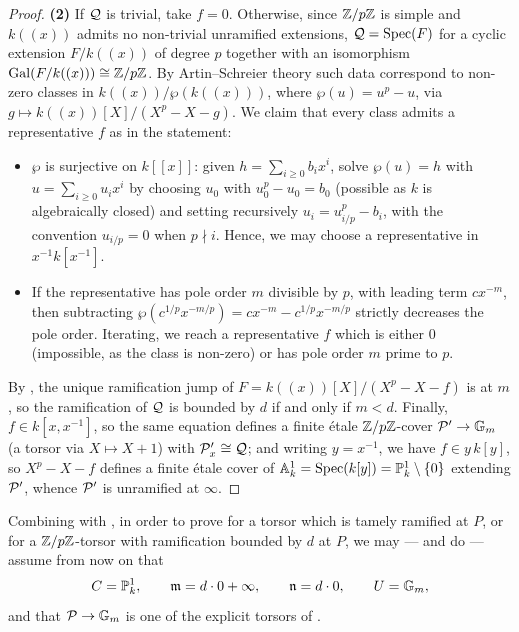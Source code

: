 \begin{proof}
    \textbf{(2)} If $\mathcal{Q}$ is trivial, take $f = 0$. Otherwise, since $\mathbb{Z}/p\mathbb{Z}$ is simple and $k((x))$ admits no non-trivial
    unramified extensions, $\mathcal{Q} = \operatorname{Spec}(F)$ for a cyclic extension $F/k((x))$ of degree $p$ together with an isomorphism
    $\operatorname{Gal}(F/k((x))) \cong \mathbb{Z}/p\mathbb{Z}$. By Artin--Schreier theory such data correspond to non-zero classes in
    $k((x))/\wp(k((x)))$, where $\wp(u) = u^p - u$, via $g \mapsto k((x))[X]/(X^p - X - g)$. We claim that every class
    admits a representative $f$ as in the statement:
    \begin{itemize}
        \item $\wp$ is surjective on $k[[x]]$: given $h = \sum_{i \geq 0} b_i x^i$, solve $\wp(u) = h$ with
        $u = \sum_{i \geq 0} u_i x^i$ by choosing $u_0$ with $u_0^p - u_0 = b_0$ (possible as $k$ is algebraically closed)
        and setting recursively $u_i = u_{i/p}^p - b_i$, with the convention $u_{i/p} = 0$ when $p \nmid i$. Hence, we may
        choose a representative in $x^{-1}k[x^{-1}]$.
        \item If the representative has pole order $m$ divisible by $p$, with leading term $cx^{-m}$, then subtracting
        $\wp(c^{1/p}x^{-m/p}) = cx^{-m} - c^{1/p}x^{-m/p}$ strictly decreases the pole order. Iterating, we reach a
        representative $f$ which is either $0$ (impossible, as the class is non-zero) or has pole order $m$ prime to $p$.
    \end{itemize}
    By , the unique ramification jump of $F = k((x))[X]/(X^p - X - f)$ is at $m$,
    so the ramification of $\mathcal{Q}$ is bounded by $d$ if and only if $m < d$.
    Finally, $f \in k[x, x^{-1}]$, so the same equation defines a finite étale $\mathbb{Z}/p\mathbb{Z}$-cover $\mathcal{P}' \to \mathbb{G}_m$ (a torsor via
    $X \mapsto X + 1$) with $\mathcal{P}'_x \cong \mathcal{Q}$; and writing $y = x^{-1}$, we have $f \in y\,k[y]$, so $X^p - X - f$ defines
    a finite étale cover of $\mathbb{A}^1_k = \operatorname{Spec}(k[y]) = \mathbb{P}^1_k \setminus \{0\}$ extending $\mathcal{P}'$, whence $\mathcal{P}'$ is
    unramified at $\infty$.
\end{proof}

Combining  with , in order to prove
 for a torsor which is tamely ramified at $P$, or for a $\mathbb{Z}/p\mathbb{Z}$-torsor with
ramification bounded by $d$ at $P$, we may --- and do --- assume from now on that
$$C = \mathbb{P}^1_k, \qquad \mathfrak{m} = d \cdot 0 + \infty, \qquad \mathfrak{n} = d \cdot 0, \qquad U = \mathbb{G}_m,$$
and that $\mathcal{P} \to \mathbb{G}_m$ is one of the explicit torsors of .



